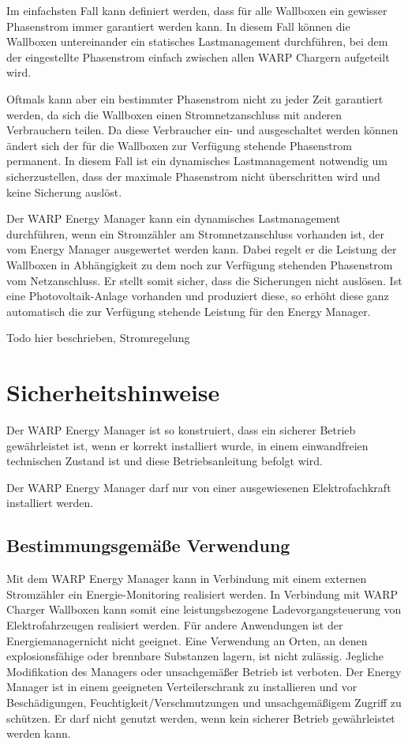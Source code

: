 \documentclass[a4paper,10pt]{article}
\newcommand{\hint}[1]{\begin{tcolorbox}[colback=boxgray,colframe=black,coltext=
white,title=Hinweis,left*=2mm,right*=2mm,boxsep=1mm,bottom=1mm,top=1mm]#1\end{tcolorbox}}
\begin{document}
\begin{multicols*}{2}
	Im einfachsten Fall kann definiert werden, dass für alle Wallboxen ein
	gewisser Phasenstrom immer garantiert werden kann. In diesem Fall können
	die Wallboxen untereinander ein statisches Lastmanagement durchführen, bei
	dem der eingestellte Phasenstrom einfach zwischen allen WARP Chargern
	aufgeteilt wird.

	Oftmals kann aber ein bestimmter Phasenstrom nicht zu jeder Zeit garantiert
	werden, da sich die Wallboxen einen Stromnetzanschluss mit anderen
	Verbrauchern teilen. Da diese Verbraucher ein- und ausgeschaltet werden
	können ändert sich der für die Wallboxen zur Verfügung stehende Phasenstrom
	permanent. In diesem Fall ist ein dynamisches Lastmanagement notwendig um
	sicherzustellen, dass der maximale Phasenstrom nicht überschritten wird und
	keine Sicherung auslöst. 

	Der WARP Energy Manager kann ein dynamisches Lastmanagement durchführen,
	wenn ein Stromzähler am Stromnetzanschluss vorhanden ist, der vom Energy Manager
	ausgewertet werden kann. Dabei regelt er die Leistung der Wallboxen in Abhängigkeit 
	zu dem noch zur Verfügung stehenden Phasenstrom vom Netzanschluss. Er stellt somit sicher,
	dass die Sicherungen nicht auslösen. Ist eine Photovoltaik-Anlage vorhanden
	und produziert diese, so erhöht diese ganz automatisch die zur Verfügung stehende
	Leistung für den Energy Manager.

	Todo hier beschrieben, Stromregelung

	\newpage
	\section{Sicherheitshinweise}
	Der WARP Energy Manager ist so konstruiert, dass ein sicherer Betrieb gewährleistet ist,
	wenn er korrekt installiert wurde, in einem einwandfreien technischen Zustand
	ist und diese Betriebsanleitung befolgt wird. \hint{Der WARP Energy Manager darf nur von einer ausgewiesenen Elektrofachkraft installiert
		werden.}

	\subsection{Bestimmungsgemäße Verwendung}
	Mit dem WARP Energy Manager kann in Verbindung mit einem externen
	Stromzähler ein Energie-Monitoring realisiert werden. In Verbindung mit WARP
	Charger Wallboxen kann somit eine leistungsbezogene Ladevorgangsteuerung von
	Elektrofahrzeugen realisiert werden. Für andere Anwendungen ist der
	Energiemanagernicht nicht geeignet. Eine Verwendung
	an Orten, an denen explosionsfähige oder brennbare Substanzen lagern, ist nicht
	zulässig. Jegliche Modifikation des Managers oder unsachgemäßer Betrieb ist verboten. 
	Der Energy Manager ist in einem geeigneten Verteilerschrank zu installieren
	und vor Beschädigungen, Feuchtigkeit/Verschmutzungen und unsachgemäßigem
	Zugriff zu 	schützen. Er darf nicht genutzt werden, wenn kein sicherer Betrieb
	gewährleistet werden kann.


\end{multicols*}
\end{document}
